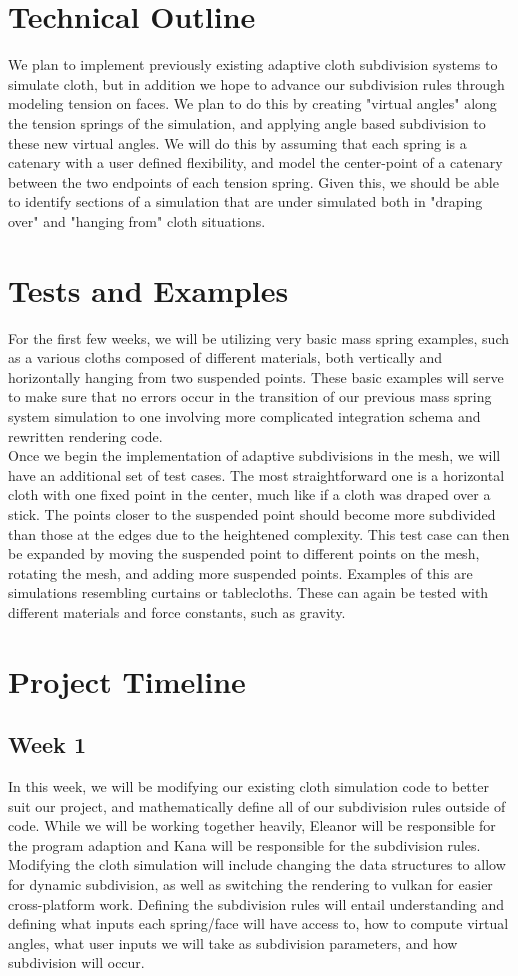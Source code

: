 \documentclass{article}
\begin{document}
\begin{multicols}{2}
\section*{Technical Outline}
We plan to implement previously existing adaptive cloth subdivision systems \cite{hutchinson} to simulate cloth, but in addition we hope to advance our subdivision rules through modeling tension on faces. We plan to do this by creating "virtual angles" along the tension springs of the simulation, and applying angle based subdivision \cite{hutchinson} to these new virtual angles. We will do this by assuming that each spring is a catenary with a user defined flexibility, and model the center-point of a catenary between the two endpoints of each tension spring. Given this, we should be able to identify sections of a simulation that are under simulated both in "draping over" and "hanging from" cloth situations.
\section*{Tests and Examples}
For the first few weeks, we will be utilizing very basic mass spring examples, such as a various cloths composed of different materials, both vertically and horizontally hanging from two suspended points. These basic examples will serve to make sure that no errors occur in the transition of our previous mass spring system simulation to one involving more complicated integration schema and rewritten rendering code. 
\\Once we begin the implementation of adaptive subdivisions in the mesh, we will have an additional set of test cases. The most straightforward one is a horizontal cloth with one fixed point in the center, much like if a cloth was draped over a stick. The points closer to the suspended point should become more subdivided than those at the edges due to the heightened complexity. This test case can then be expanded by moving the suspended point to different points on the mesh, rotating the mesh, and adding more suspended points. Examples of this are simulations resembling curtains or tablecloths. These can again be tested with different materials and force constants, such as gravity.
\section*{Project Timeline}
\subsection*{Week 1}
In this week, we will be modifying our existing cloth simulation code to better suit our project, and mathematically define all of our subdivision rules outside of code. While we will be working together heavily, Eleanor will be responsible for the program adaption and Kana will be responsible for the subdivision rules. Modifying the cloth simulation will include changing the data structures to allow for dynamic subdivision, as well as switching the rendering to vulkan for easier cross-platform work. Defining the subdivision rules will entail understanding and defining what inputs each spring/face will have access to, how to compute virtual angles, what user inputs we will take as subdivision parameters, and how subdivision will occur.

\end{multicols}
\end{document}
